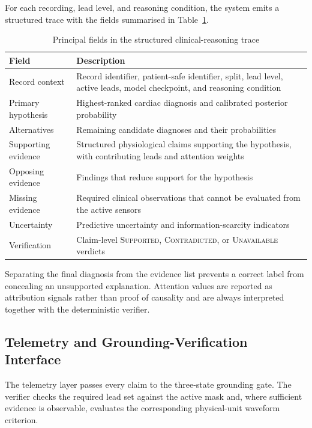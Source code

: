 \documentclass{ssnreview}
\begin{document}
For each recording, lead level, and reasoning condition, the system emits a structured
trace with the fields summarised in Table~\ref{tab:trace-fields}.

\begin{table}[H]
  \centering
  \caption{Principal fields in the structured clinical-reasoning trace}
  \label{tab:trace-fields}
  \begin{tabularx}{\textwidth}{@{}l>{\raggedright\arraybackslash}X@{}}
    \toprule
    \textbf{Field} & \textbf{Description} \\
    \midrule
    Record context & Record identifier, patient-safe identifier, split, lead level,
    active leads, model checkpoint, and reasoning condition \\
    Primary hypothesis & Highest-ranked cardiac diagnosis and calibrated posterior
    probability \\
    Alternatives & Remaining candidate diagnoses and their probabilities \\
    Supporting evidence & Structured physiological claims supporting the hypothesis,
    with contributing leads and attention weights \\
    Opposing evidence & Findings that reduce support for the hypothesis \\
    Missing evidence & Required clinical observations that cannot be evaluated from the
    active sensors \\
    Uncertainty & Predictive uncertainty and information-scarcity indicators \\
    Verification & Claim-level \textsc{Supported}, \textsc{Contradicted}, or
    \textsc{Unavailable} verdicts \\
    \bottomrule
  \end{tabularx}
\end{table}

Separating the final diagnosis from the evidence list prevents a correct label from
concealing an unsupported explanation. Attention values are reported as attribution
signals rather than proof of causality and are always interpreted together with the
deterministic verifier.

\subsection{Telemetry and Grounding-Verification Interface}

The telemetry layer passes every claim to the three-state grounding gate. The verifier
checks the required lead set against the active mask and, where sufficient evidence is
observable, evaluates the corresponding physical-unit waveform criterion.
\end{document}
